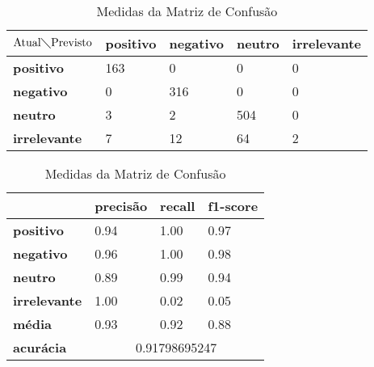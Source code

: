 \begin{table}[h!]
\centering
\begin{minipage}[b]{0.45\linewidth}
\caption{Matriz de Confusão Quaternário: \textit{Decision Tree}}
\label{tab:mcb-nb}
\begin{tabular}{|l|l|l|l|l|}
\hline
$\textrm{Atual}\diagdown\textrm{Previsto}$ & \textbf{positivo} & \textbf{negativo} & \textbf{neutro} & \textbf{irrelevante}\\ \hline
\textbf{positivo} & 163 & 0 & 0 & 0\\ \hline
\textbf{negativo} & 0 & 316 & 0 & 0\\ \hline
\textbf{neutro} & 3 & 2 & 504 & 0\\ \hline
\textbf{irrelevante} & 7 & 12 & 64 & 2\\ \hline
\end{tabular}
\end{minipage}
\hspace{0.5cm}
\begin{minipage}[b]{0.45\linewidth}

\centering
\caption{Medidas da Matriz de Confusão}
\label{tab:mmcb-nb}
\begin{tabular}{|l|l|l|l|}
\hline
         & \textbf{precisão} & \textbf{recall} & \textbf{f1-score} \\ \hline
\textbf{positivo} & 0.94     & 1.00   & 0.97     \\ \hline
\textbf{negativo} & 0.96     & 1.00   & 0.98     \\ \hline
\textbf{neutro} & 0.89     & 0.99   & 0.94     \\ \hline
\textbf{irrelevante} & 1.00     & 0.02   & 0.05     \\ \hline
\textbf{média} & 0.93     & 0.92   & 0.88     \\ \hline
\textbf{acurácia} & \multicolumn{3}{|c|}{0.91798695247}\\ \hline
\end{tabular}
\end{minipage}
\end{table}

